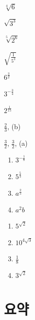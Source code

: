 \documentclass{oblivoir}
\begin{document}
\begin{multicols*}{2}
%
\begin{enumerate*}[itemjoin=\;\;]
\item
\(\sqrt[4]6\)
\item
\(\sqrt{3^3}\)
\item
\(\sqrt[5]{2^6}\)
\item
\(\sqrt{\frac1{5^3}}\)
\end{enumerate*}

%
\begin{enumerate*}[itemjoin=\quad]
\item
\(6^{\frac32}\)
\item
\(3^{-\frac34}\)
\item
\(2^{\frac1{15}}\)
\end{enumerate*}

%
\begin{enumerate*}[itemjoin=\quad]
\item
\(\frac23\), (b)
\item
\(\frac32\), \(\frac32\), (a)
\end{enumerate*}

%
\begin{enumerate}
\item
\(3^{-\frac18}\)
\item
\(5^{\frac53}\)
\item
\(a^{\frac25}\)
\item
\(a^2b\)
\end{enumerate}

%
\begin{enumerate}
\item
\(5^{\sqrt2}\)
\item
\(10^{4\sqrt3}\)
\item
\(\frac18\)
\item
\(3^{\sqrt2}\)
\end{enumerate}

\end{multicols*}

%
\section*{요약}
\end{document}
